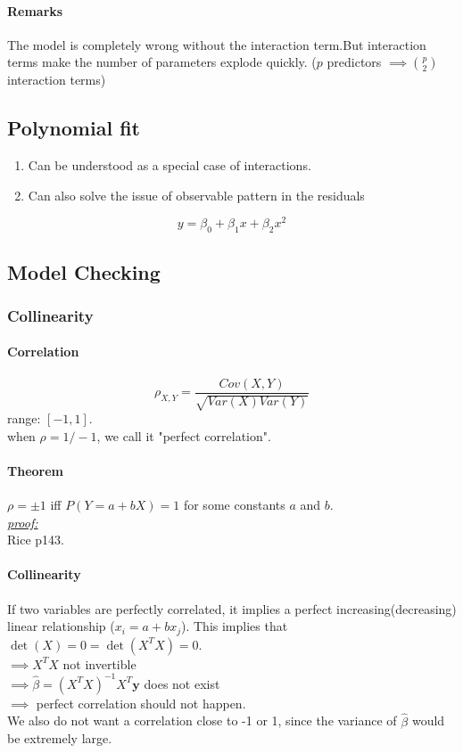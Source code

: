 \documentclass[11pt]{article}
\newcommand{\tb}[1]{\textbf{#1}}
\newcommand{\proof}[0]{\textit{\underline{proof:} }}
\newcommand{\vy}[0]{\tb{y}}
\begin{document}
\paragraph{Remarks}
The model is completely wrong without the interaction term.But interaction terms make the number of parameters explode quickly. ($p$ predictors $\implies {p \choose 2}$ interaction terms)

\subsection{Polynomial fit}
\begin{enumerate}
	\item Can be understood as a special case of interactions. 
	\item Can also solve the issue of observable pattern in the residuals
\end{enumerate}
$$y = \beta_0 + \beta_1 x + \beta_2 x^2$$

\subsection{Model Checking}
\subsubsection{Collinearity}
\paragraph{Correlation}
$$\rho_{X,Y} = \frac{Cov(X, Y)}{\sqrt{Var(X)Var(Y)}}$$
range: $[-1, 1]$.\\
when $\rho = 1/-1$, we call it "perfect correlation".
\paragraph{Theorem}
$\rho = \pm 1$ iff $P(Y = a + bX) = 1$ for some constants $a$ and $b$. \\
\proof \\
Rice p143.
\paragraph{Collinearity}
If two variables are perfectly correlated, it implies a perfect increasing(decreasing) linear relationship ($x_i = a+ bx_j$). This implies that $\det(X) = 0 = \det(X^TX) = 0$.\\
$\implies X^TX$ not invertible \\
$\implies \hat{\beta} = (X^TX)^{-1}X^T\vy$ does not exist \\
$\implies$ perfect correlation should not happen. \\
We also do not want a correlation close to -1 or 1, since the variance of $\hat{\beta}$ would be extremely large.
\end{document}
